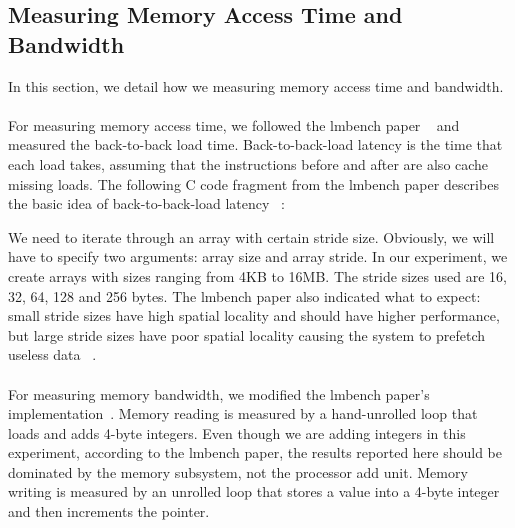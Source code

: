 \subsection{Measuring Memory Access Time and Bandwidth}
In this section, 
we detail how we measuring memory access time and bandwidth.\\
\\
For measuring memory access time, we followed the lmbench paper ~\cite{mcvoy1996lmbench} and measured the back-to-back load time.
Back-to-back-load latency is the time that each load takes, assuming that
the instructions before and after are also cache missing loads. 
The following C code fragment from the lmbench paper describes the basic idea of back-to-back-load latency ~\cite{mcvoy1996lmbench}:

We need to iterate through an array with certain stride size.
Obviously, we will have to specify two arguments: array size and array stride. 
In our experiment, we create arrays with sizes ranging from 4KB to 16MB. 
The stride sizes used are 16, 32, 64, 128 and 256 bytes.
The lmbench paper also indicated what to expect: small stride sizes have high spatial locality and should have higher performance, but
large stride sizes have poor spatial locality causing the
system to prefetch useless data ~\cite{mcvoy1996lmbench}.\\
\\
For measuring memory bandwidth, we modified the lmbench paper's implementation~\cite{mcvoy1996lmbench}.
Memory reading is measured by a hand-unrolled loop that loads and adds 4-byte integers.
Even though we are adding integers in this experiment, 
according to the lmbench paper, the
results reported here should be dominated by the
memory subsystem, not the processor add unit.
Memory writing is measured by an unrolled loop
that stores a value into a 4-byte integer and then increments the pointer.


